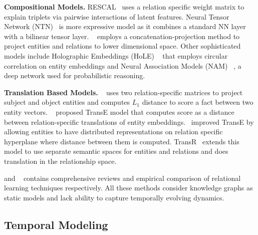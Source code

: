 \documentclass{article}
\begin{document}
{\bf Compositional Models.} RESCAL~\citep{NicTreKri11} uses a relation specific weight matrix to explain triplets via pairwise interactions of latent features. Neural Tensor Network (NTN)~\citep{SocCheManNg13} is more expressive model as it combines a standard NN layer with a bilinear tensor layer. ~\citep{DonGabHeiHorLaoMurStrSunZha14} employs a concatenation-projection method to project entities and relations to lower dimensional space. Other sophisticated models include Holographic Embeddings (HoLE) ~\citep{NicRosPog16} that employs circular correlation on entity embeddings and Neural Association Models (NAM)  ~\citep{LiuJiaEvdLinZhuXiaWeiHu16}, a deep network used for probabilistic reasoning.

{\bf Translation Based Models.}
~\citep{BorWesColBen11} uses two relation-specific matrices to project subject and object entities and computes $L_1$ distance to score a fact between two entity vectors. ~\cite{BorUsuGarWesetal13} proposed TransE model that computes score as a distance between relation-specific translations of entity embeddings.~\citep{WanZhaFenChe14} improved TransE by allowing entities to have distributed representations on relation specific hyperplane where distance between them is computed. TransR~\citep{LinLiuSunZhu15} extends this model to use separate semantic spaces for entities and relations and does translation in the relationship space.

\citep{NicMurTreGab16} and ~\citep{YanYihHeGaoDen15,TouChe15} contains comprehensive reviews and empirical comparison of relational learning techniques respectively. All these methods consider knowledge graphs as static models and lack ability to capture temporally evolving dynamics. 

\vspace{-0.2cm}
\subsection{Temporal Modeling}
\end{document}
